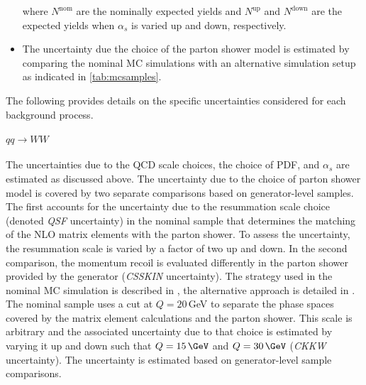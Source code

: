\begin{itemize}
    where $N^\text{nom}$ are the nominally expected yields and $N^\text{up}$ and $N^\text{down}$ are the expected yields when $\alpha_s$ is varied up and down, respectively.
    \item The uncertainty due the choice of the parton shower model is estimated by comparing the nominal MC simulations with an alternative simulation setup as indicated in \cref{tab:mcsamples}. 
\end{itemize}

\noindent The following provides details on the specific uncertainties considered for each background process. 
\paragraph{$qq \to WW$} 
The uncertainties due to the QCD scale choices, the choice of PDF, and $\alpha_s$ are estimated as discussed above.
The uncertainty due to the choice of parton shower model is covered by two separate comparisons based on generator-level samples.
The first accounts for the uncertainty due to the resummation scale choice (denoted \emph{QSF} uncertainty) in the nominal sample that determines the matching of the NLO matrix elements with the parton shower. 
To assess the uncertainty, the resummation scale is varied by a factor of two up and down.
In the second comparison, the momentum recoil is evaluated differently in the parton shower provided by the \Sherpa generator (\emph{CSSKIN} uncertainty). The strategy used in the nominal MC simulation is described in \cite{Hoeche:2009rj}, the alternative approach is detailed in \cite{Schumann:2007mg}. 
The nominal \Sherpa sample uses a cut at $Q=20\,$GeV to separate the phase spaces covered by the matrix element calculations and the parton shower. This scale is arbitrary and the associated uncertainty due to that choice is estimated by varying it up and down such that $Q = 15\,\GeV$ and $Q = 30\,\GeV$ (\emph{CKKW} uncertainty). The uncertainty is estimated based on generator-level sample comparisons.

